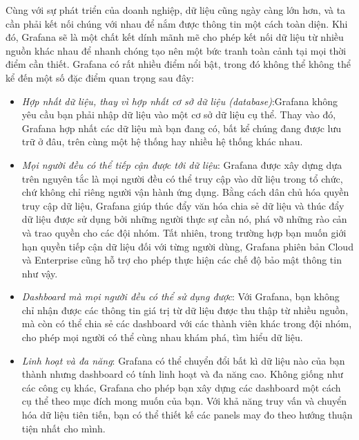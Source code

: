 Cùng với sự phát triển của doanh nghiệp, dữ liệu cũng ngày càng lớn hơn, và ta cần phải kết nối chúng với nhau để nắm được thông tin một cách toàn diện. Khi đó, Grafana sẽ là một chất kết dính mãnh mẽ cho phép kết nối dữ liệu từ nhiều nguồn khác nhau để nhanh chóng tạo nên một bức tranh toàn cảnh tại mọi thời điểm cần thiết. Grafana có rất nhiều điểm nổi bật, trong đó không thể không thể kể đến một số đặc điểm quan trọng sau đây:
\begin{itemize}
    \item \textit{Hợp nhất dữ liệu, thay vì hợp nhất cơ sở dữ liệu (database)}:Grafana không yêu cầu bạn phải nhập dữ liệu vào một cơ sở dữ liệu cụ thể. Thay vào đó, Grafana hợp nhất các dữ liệu mà bạn đang có, bất kể chúng đang được lưu trữ ở đâu, trên cùng một hệ thống hay nhiều hệ thống khác nhau.
    \item \textit{Mọi người đều có thể tiếp cận được tới dữ liệu}: Grafana được xây dựng dựa trên nguyên tắc là mọi người đều có thể truy cập vào dữ liệu trong tổ chức, chứ không chỉ riêng người vận hành ứng dụng. Bằng cách dân chủ hóa quyền truy cập dữ liệu, Grafana giúp thúc đẩy văn hóa chia sẻ dữ liệu và thúc đẩy dữ liệu được sử dụng bởi những người thực sự cần nó, phá vỡ những rào cản và trao quyền cho các đội nhóm. Tất nhiên, trong trường hợp bạn muốn giới hạn quyền tiếp cận dữ liệu đối với từng người dùng, Grafana phiên bản Cloud và Enterprise cũng hỗ trợ cho phép thực hiện các chế độ bảo mật thông tin như vậy.
    \item \textit{Dashboard mà mọi người đều có thể sử dụng được}: Với Grafana, bạn không chỉ nhận được các thông tin giá trị từ dữ liệu được thu thập từ nhiều nguồn, mà còn có thể chia sẻ các dashboard với các thành viên khác trong đội nhóm, cho phép mọi người có thể cùng nhau khám phá, tìm hiểu dữ liệu.
    \item \textit{Linh hoạt và đa năng}: Grafana có thể chuyển đổi bất kì dữ liệu nào của bạn thành nhưng dashboard có tính linh hoạt và đa năng cao. Không giống như các công cụ khác, Grafana cho phép bạn xây dựng các dashboard một cách cụ thể theo mục đích mong muốn của bạn. Với khả năng truy vấn và chuyển hóa dữ liệu tiên tiến, bạn có thể thiết kế các panels may đo theo hướng thuận tiện nhất cho mình.
\end{itemize}

